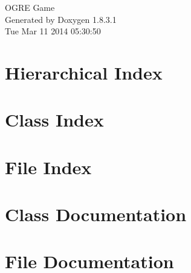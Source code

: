 \documentclass{book}
\begin{document}
\hypersetup{pageanchor=false,citecolor=blue}
\begin{titlepage}
\vspace*{7cm}
\begin{center}
{\Large O\-G\-R\-E Game }\\
\vspace*{1cm}
{\large Generated by Doxygen 1.8.3.1}\\
\vspace*{0.5cm}
{\small Tue Mar 11 2014 05:30:50}\\
\end{center}
\end{titlepage}
\clearemptydoublepage
{}
\tableofcontents
\clearemptydoublepage
{}
\hypersetup{pageanchor=true,citecolor=blue}
\chapter{Hierarchical Index}

\chapter{Class Index}

\chapter{File Index}

\chapter{Class Documentation}












\chapter{File Documentation}




















\printindex
\end{document}
